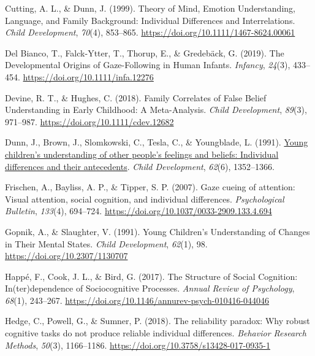 \documentclass[
  man,floatsintext]{apa6}
\newlength{\cslhangindent}
\newlength{\cslentryspacingunit} %
\newenvironment{CSLReferences}[2] %
 {%
  \setlength{\parindent}{0pt}
  \ifodd #1
  \let\oldpar\par
  \def\par{\hangindent=\cslhangindent\oldpar}
  \fi
  \setlength{\parskip}{#2\cslentryspacingunit}
 }%
 {}
\begin{document}
\begin{CSLReferences}{1}{0}
\leavevmode{}%
Cutting, A. L., \& Dunn, J. (1999). Theory of {Mind}, {Emotion Understanding}, {Language}, and {Family Background}: {Individual Differences} and {Interrelations}. \emph{Child Development}, \emph{70}(4), 853--865. \url{https://doi.org/10.1111/1467-8624.00061}

\leavevmode{}%
Del Bianco, T., Falck-Ytter, T., Thorup, E., \& Gredebäck, G. (2019). The {Developmental Origins} of {Gaze-Following} in {Human Infants}. \emph{Infancy}, \emph{24}(3), 433--454. \url{https://doi.org/10.1111/infa.12276}

\leavevmode{}%
Devine, R. T., \& Hughes, C. (2018). Family {Correlates} of {False Belief Understanding} in {Early Childhood}: {A Meta-Analysis}. \emph{Child Development}, \emph{89}(3), 971--987. \url{https://doi.org/10.1111/cdev.12682}

\leavevmode{}%
Dunn, J., Brown, J., Slomkowski, C., Tesla, C., \& Youngblade, L. (1991). \href{https://www.ncbi.nlm.nih.gov/pubmed/1786720}{Young children's understanding of other people's feelings and beliefs: Individual differences and their antecedents}. \emph{Child Development}, \emph{62}(6), 1352--1366.

\leavevmode{}%
Frischen, A., Bayliss, A. P., \& Tipper, S. P. (2007). Gaze cueing of attention: {Visual} attention, social cognition, and individual differences. \emph{Psychological Bulletin}, \emph{133}(4), 694--724. \url{https://doi.org/10.1037/0033-2909.133.4.694}

\leavevmode{}%
Gopnik, A., \& Slaughter, V. (1991). Young {Children}'s {Understanding} of {Changes} in {Their Mental States}. \emph{Child Development}, \emph{62}(1), 98. \url{https://doi.org/10.2307/1130707}

\leavevmode{}%
Happé, F., Cook, J. L., \& Bird, G. (2017). The {Structure} of {Social Cognition}: {In}(ter)dependence of {Sociocognitive Processes}. \emph{Annual Review of Psychology}, \emph{68}(1), 243--267. \url{https://doi.org/10.1146/annurev-psych-010416-044046}

\leavevmode{}%
Hedge, C., Powell, G., \& Sumner, P. (2018). The reliability paradox: {Why} robust cognitive tasks do not produce reliable individual differences. \emph{Behavior Research Methods}, \emph{50}(3), 1166--1186. \url{https://doi.org/10.3758/s13428-017-0935-1}


\end{CSLReferences}
\end{document}
